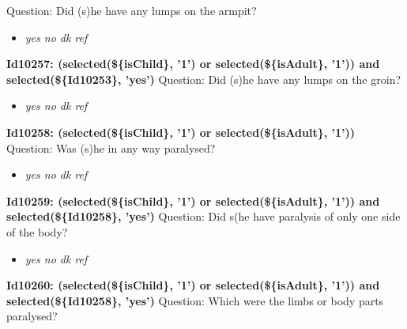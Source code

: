 \documentclass{article}%
\begin{document}
Question: Did (s)he have any lumps on the armpit?\newline%
%
\begin{itemize}%
\item%
\textit{yes\newline%
 no\newline%
 dk\newline%
 ref\newline%
}%
\end{itemize}%
\textbf{Id10257: (selected(\$\{isChild\}, '1') or selected(\$\{isAdult\}, '1')) and selected(\$\{Id10253\}, 'yes')\newline%
}%
Question: Did (s)he have any lumps on the groin?\newline%
%
\begin{itemize}%
\item%
\textit{yes\newline%
 no\newline%
 dk\newline%
 ref\newline%
}%
\end{itemize}%
\textbf{Id10258: (selected(\$\{isChild\}, '1') or selected(\$\{isAdult\}, '1'))\newline%
}%
Question: Was (s)he in any way paralysed?\newline%
%
\begin{itemize}%
\item%
\textit{yes\newline%
 no\newline%
 dk\newline%
 ref\newline%
}%
\end{itemize}%
\textbf{Id10259: (selected(\$\{isChild\}, '1') or selected(\$\{isAdult\}, '1')) and selected(\$\{Id10258\}, 'yes')\newline%
}%
Question: Did s(he have paralysis of only one side of the body?\newline%
%
\begin{itemize}%
\item%
\textit{yes\newline%
 no\newline%
 dk\newline%
 ref\newline%
}%
\end{itemize}%
\textbf{Id10260: (selected(\$\{isChild\}, '1') or selected(\$\{isAdult\}, '1')) and selected(\$\{Id10258\}, 'yes')\newline%
}%
Question: Which were the limbs or body parts paralysed?\newline%
\end{document}
